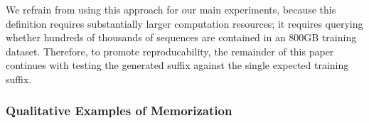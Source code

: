 We refrain from using this approach for our main experiments,
%
%
because this definition requires substantially larger computation resources; it requires
querying whether hundreds of thousands of sequences are contained in an 800GB
training dataset.
%
Therefore, to promote reproducability, the remainder of this paper continues with testing the generated suffix against the single expected training suffix.
%

\subsubsection{Qualitative Examples of Memorization}

